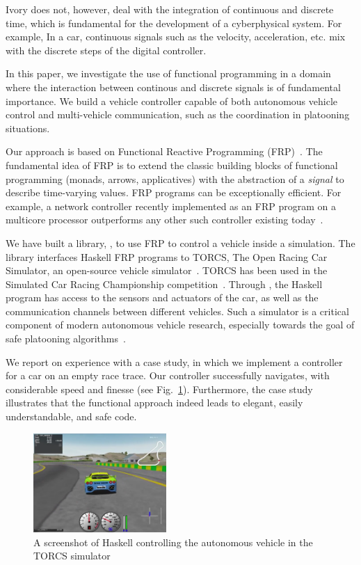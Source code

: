 Ivory does not, however, deal with the integration of 
continuous and discrete time, which is fundamental for the
development of a cyberphysical system. For example,
In a car, continuous signals such as the velocity, acceleration, etc.
mix with the discrete steps of the digital controller.

In this paper, we investigate the use of functional programming
in a domain where the interaction between continous and discrete signals
is of fundamental importance. We build a vehicle controller capable
of both autonomous vehicle control and multi-vehicle communication,
such as the coordination in platooning situations.

Our approach is based on Functional Reactive Programming
(FRP)~\cite{hudak2003arrows,hudak2000haskell}.
The fundamental idea of FRP is to extend the classic building blocks 
of functional programming (\eg monads, arrows,
applicatives)
with the abstraction of a \emph{signal} to
describe time-varying values. FRP programs can be exceptionally
efficient.  For example, a network controller recently implemented as
an FRP program on a multicore processor outperforms any other such
controller existing today~\cite{Voellmy:2012:SSD:2377677.2377735}.

We have built a library, \ourLib, to use FRP to control a vehicle inside a simulation.
The library interfaces Haskell FRP programs to TORCS, The Open Racing Car Simulator, an open-source vehicle simulator~\cite{torcs}.
TORCS has been used in the Simulated Car Racing Championship competition~\cite{SCRC}.
Through \ourLib, the Haskell program has access to the sensors and actuators of the car, as well
as the communication channels between different vehicles.
Such a simulator is a  critical component of modern autonomous vehicle research, especially towards the goal of safe platooning algorithms~\cite{?}.

We report on experience with a case study, in which we implement a controller for a car on an empty race trace. Our controller successfully navigates, with considerable speed and finesse (see Fig.~\ref{fig:race}). Furthermore, the case study illustrates that the functional approach indeed leads to elegant, easily
understandable, and safe code.

\begin{figure}[t]
\includegraphics[width=0.45\textwidth]{figs/racing.png}
\caption{A screenshot of Haskell controlling the autonomous vehicle in the TORCS simulator}
\label{fig:race}
\end{figure}
